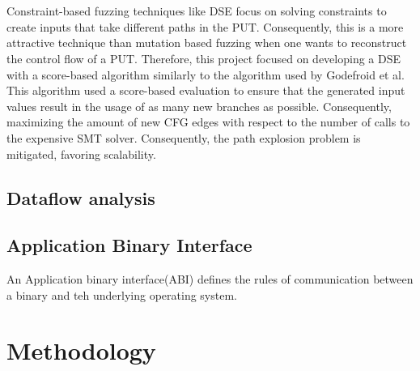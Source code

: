 \documentclass{kththesis}
\begin{document}
\\ \\
Constraint-based fuzzing techniques like DSE focus on solving constraints to create inputs that take different paths in the PUT. Consequently, this is a more attractive technique than mutation based fuzzing when one wants to reconstruct the control flow of a PUT. Therefore, this project focused on developing a DSE with a score-based algorithm similarly to the algorithm used by Godefroid et al\cite{automatedFuzzing}. This algorithm used a score-based evaluation to ensure that the generated input values result in the usage of as many new branches as possible. Consequently, maximizing the amount of new CFG edges with respect to the number of calls to the expensive SMT solver\cite{automatedFuzzing}. Consequently, the path explosion problem is mitigated, favoring scalability.



\section{Dataflow analysis}


\section{Application Binary Interface}
An Application binary interface(ABI) defines the rules of communication between a binary and teh underlying operating system.


\chapter{Methodology}\label{chap:methodlogy}
\end{document}
